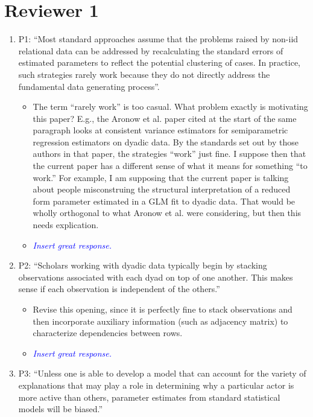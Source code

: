 \section*{Reviewer 1}

\begin{enumerate}
	\item P1: ``Most standard approaches assume that the problems raised by non-iid relational data can be addressed by recalculating the standard errors of estimated parameters to reflect the potential clustering of cases. In practice, such strategies rarely work because they do not directly address the fundamental data generating process''.
	\begin{itemize}
		\item The term “rarely work” is too casual.  What problem exactly is motivating this paper?  E.g., the Aronow et al. paper cited at the start of the same paragraph looks at consistent variance estimators for semiparametric regression estimators on dyadic data. By the standards set out by those authors in that paper, the strategies “work” just fine.  I suppose then that the current paper has a different sense of what it means for something “to work.” For example, I am supposing that the current paper is talking about people misconstruing the structural interpretation of a reduced form parameter estimated in a GLM fit to dyadic data.  That would be wholly orthogonal to what Aronow et al. were considering, but then this needs explication.
	\end{itemize}
	\begin{itemize}
		\item \textcolor{blue}{ \emph{
		Insert great response.
		}}
	\end{itemize}
	\item P2: “Scholars working with dyadic data typically begin by stacking observations associated with each dyad on top of one another. This makes sense if each observation is independent of the others.”
	\begin{itemize}
		\item Revise this opening, since it is perfectly fine to stack observations and then incorporate auxiliary information (such as adjacency matrix) to characterize dependencies between rows.
	\end{itemize}
	\begin{itemize}
		\item \textcolor{blue}{ \emph{
		Insert great response.
		}}
	\end{itemize}
	\item P3: “Unless one is able to develop a model that can account for the variety of explanations that may play a role in determining why a particular actor is more active than others, parameter estimates from standard statistical models will be biased.”

\end{enumerate}
